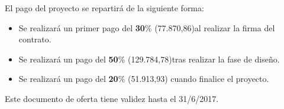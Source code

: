 \par El pago del proyecto se repartirá de la siguiente forma:
\begin{itemize}[-]
\item Se realizará un primer pago del \textbf{30}\% (77.870,86)al realizar la firma del contrato.
\item Se realizará un pago del \textbf{50}\% (129.784,78)tras realizar la fase de diseño.
\item Se realizará un pago del \textbf{20}\% (51.913,93) cuando finalice el proyecto.
\end{itemize}


\par Este documento de oferta tiene validez hasta el 31/6/2017.


\vspace{-1.8cm}
